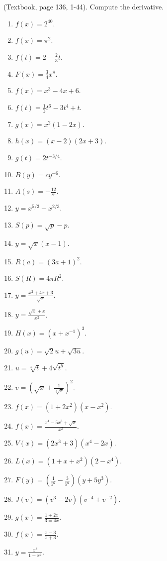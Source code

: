 \begin{problem} (Textbook, page 136, 1-44).
Compute the derivative.
\begin{multicols}{3}
\begin{enumerate}
\item $f(x)=2^{40}$.

\item $f(x)=\pi^2$.

\item $f(t)=2-\frac{2}{3}t$.

\item $F(x)=\frac{3}{4}x^8$.


\item $f(x)=x^3-4x+6$.
\item $f(t)=\frac{1}{2}t^6-3t^4+t$.
\item $g(x)=x^2(1-2x)$. 
\item $h(x)=(x-2)(2x+3)$.
\item $g(t)=2t^{-3/4}$.
\item $B(y)=c y^{-6}$.
\item $A(s)=-\frac{12}{s^5}$.
\item $y=x^{5/3}-x^{2/3}$.
\item $S(p)=\sqrt{p}-p$.
\item $y=\sqrt{x}(x-1)$.
\item $R(a)=(3a+1)^2$.
\item $S(R)=4\pi R^2$.
\item $y=\frac{ x^2+4x+3}{\sqrt{x}}$.
\item $y=\frac{\sqrt{x}+x}{x^2}$.
\item $H(x)=(x+x^{-1})^3$.
\item $g(u)=\sqrt 2 u +\sqrt{3u}$.
\item $u=\sqrt[5]t+4\sqrt{t^5}$.
\item $v=\left(\sqrt{x}+\frac{1}{\sqrt[3]{x}}\right)^2$.
\item $f(x)=(1+2x^2)(x-x^2)$.
\item $f(x)=\frac{x^4-5x^3+\sqrt{x}}{x^2}$.
\item $V(x)=(2x^3+3)(x^4-2x)$.
\item $L(x)=(1+x+x^2)(2-x^4)$.
\item $F(y)=\left(\frac{1}{y^2}-\frac{3}{y^4} \right)(y+5y^3)$.
\item $J(v)=(v^3-2v)(v^{-4}+v^{-2})$.
\item $g(x)=\frac{1+2x}{3=4x}$.
\item $f(x)=\frac{x-3}{x+3}$.
\item $y=\frac{x^3}{1-x^2}$.

\end{enumerate}
\end{multicols}
\end{problem}
